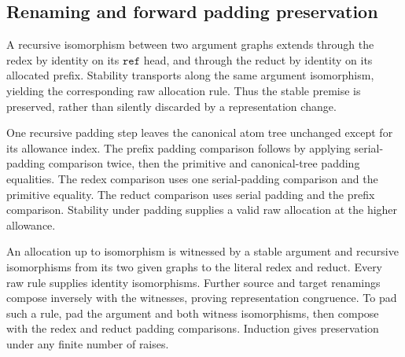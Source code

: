 




\subsection{Renaming and forward padding preservation}

A recursive isomorphism between two argument graphs extends through the
redex by identity on its $\mathtt{ref}$ head, and through the reduct by identity
on its allocated prefix. Stability transports along the same argument
isomorphism, yielding the corresponding raw allocation rule. Thus the stable
premise is preserved, rather than silently discarded by a representation change.

One recursive padding step leaves the canonical atom tree unchanged except
for its allowance index. The prefix padding comparison follows by applying
serial-padding comparison twice, then the primitive and canonical-tree padding
equalities. The redex comparison uses one serial-padding comparison and the
primitive equality. The reduct comparison uses serial padding and the prefix
comparison. Stability under padding supplies a valid raw allocation at the
higher allowance.









An allocation up to isomorphism is witnessed by a stable argument and recursive
isomorphisms from its two given graphs to the literal redex and reduct.
Every raw rule supplies identity isomorphisms. Further source and target
renamings compose inversely with the witnesses, proving representation
congruence. To pad such a rule, pad the argument and both witness isomorphisms,
then compose with the redex and reduct padding comparisons. Induction gives
preservation under any finite number of raises.

